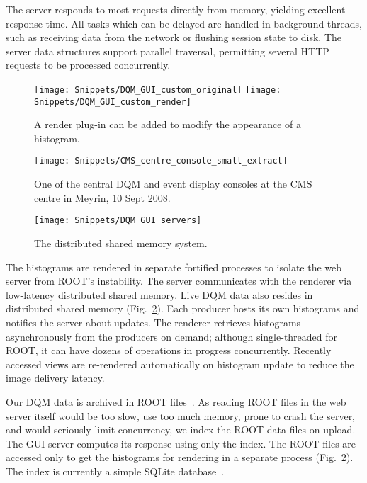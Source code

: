 \documentclass[a4paper]{jpconf}
\begin{document}
The server responds to most requests directly from memory, yielding
excellent response time.  All tasks which can be delayed are handled
in background threads, such as receiving data from the network or
flushing session state to disk.  The server data structures support
parallel traversal, permitting several HTTP requests to be processed
concurrently.

\begin{figure}[!tbp]
\begin{center}
\texttt{[image: Snippets/DQM\_GUI\_custom\_original]}\hfill
\raisebox{6em}{\LARGE\,$\Rightarrow$}\hfill
\texttt{[image: Snippets/DQM\_GUI\_custom\_render]}
\end{center}
\caption{\label{fig:plugin}A render plug-in can be added to modify the appearance of a histogram.}
\end{figure}

\begin{figure}[!tbp]
\begin{minipage}{.45\textwidth}
\begin{center}
\texttt{[image: Snippets/CMS\_centre\_console\_small\_extract]}
\caption{\label{fig:console}One of the central DQM and event display consoles at the CMS centre in Meyrin, 10 Sept 2008.}
\end{center}
\end{minipage}
\hfill
\begin{minipage}{.45\textwidth}
\begin{center}
\texttt{[image: Snippets/DQM\_GUI\_servers]}
\caption{\label{fig:shmem}The distributed shared memory system.}
\end{center}
\end{minipage}
\end{figure}

The histograms are rendered in separate fortified processes to isolate
the web server from ROOT's instability.  The server communicates with
the renderer via low-latency distributed shared memory.  Live DQM data
also resides in distributed shared memory (Fig.~\ref{fig:shmem}).
Each producer hosts its own histograms and notifies the server about
updates.  The renderer retrieves histograms asynchronously from the
producers on demand; although single-threaded for ROOT, it can have
dozens of operations in progress concurrently.  Recently accessed
views are re-rendered automatically on histogram update to reduce the
image delivery latency.

Our DQM data is archived in ROOT files~\cite{root}.  As reading ROOT
files in the web server itself would be too slow, use too much memory,
prone to crash the server, and would seriously limit concurrency, we
index the ROOT data files on upload.  The GUI server computes its
response using only the index.  The ROOT files are accessed only to
get the histograms for rendering in a separate process
(Fig.~\ref{fig:shmem}).  The index is currently a simple SQLite
database~\cite{sqlite}.
\end{document}
